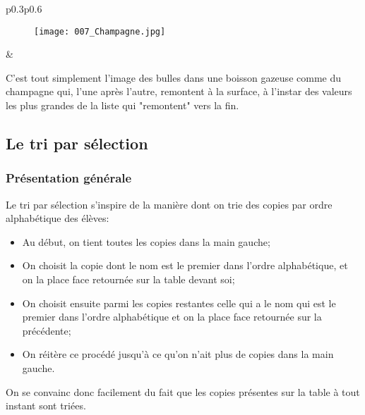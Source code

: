 \documentclass[12pt]{article}
\begin{document}
	
	\begin{MaReponse}
		\begin{tabular}{p{0.3\textwidth}p{0.6\textwidth}}
			\begin{minipage}{\linewidth}
				\begin{figure}[H]
					\centering
					\texttt{[image: 007\_Champagne.jpg]}
				\end{figure}
			\end{minipage}
			&
			\begin{minipage}{\linewidth}
				C'est tout simplement l'image des bulles dans une boisson gazeuse comme du champagne qui, l'une après l'autre, remontent à la surface, à l'instar des valeurs les plus grandes de la liste qui "remontent" vers la fin.
			\end{minipage}
		\end{tabular}			
	\end{MaReponse}
		
	\subsection{Le tri par sélection}
	\subsubsection*{Présentation générale}
	Le tri par sélection s'inspire de la manière dont on trie des copies par ordre alphabétique des élèves:
	\begin{itemize}
		\item Au début, on tient toutes les copies dans la main gauche;
		\item On choisit la copie dont le nom est le premier dans l'ordre alphabétique, et on la place face retournée sur la table devant soi;
		\item On choisit ensuite parmi les copies restantes celle qui a le nom qui est le premier dans l'ordre alphabétique et on la place face retournée sur la précédente;
		\item On réitère ce procédé jusqu'à ce qu'on n'ait plus de copies dans la main gauche.
	\end{itemize}
	
	On se convainc donc facilement du fait que les copies présentes sur la table à tout instant sont triées.
	
\end{document}
